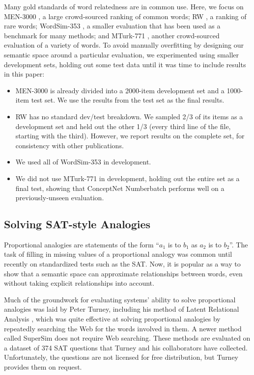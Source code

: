 \documentclass[letterpaper]{article}
\begin{document}
Many gold standards of word relatedness are in common use. Here, we focus on
MEN-3000 \cite{bruni2014men}, a large crowd-sourced ranking of common words; RW
\cite{luong2013rw}, a ranking of rare words; WordSim-353 \cite{finkelstein2001ws},
a smaller evaluation that has been used as a benchmark for many methods; and MTurk-771
\cite{halawi2012mturk}, another crowd-sourced evaluation of a variety of words.
To avoid manually overfitting by designing our semantic space around a
particular evaluation, we experimented using smaller development sets, holding
out some test data until it was time to include results in this paper:

\begin{itemize}
\item
    MEN-3000 is already divided into a 2000-item development set and a
    1000-item test set. We use the results from the test set as the final results.
\item
    RW has no standard dev/test breakdown. We sampled 2/3 of its items as
    a development set and held out the other 1/3 (every third line of the file,
    starting with the third). However, we report results on the complete set,
    for consistency with other publications.
\item
    We used all of WordSim-353 in development.
\item
    We did not use MTurk-771 in development, holding out the entire set
    as a final test, showing that ConceptNet Numberbatch performs well on a
    previously-unseen evaluation.
\end{itemize}

\subsection{Solving SAT-style Analogies}

Proportional analogies are statements of the form ``$a_1$ is to $b_1$ as $a_2$
is to $b_2$''. The task of filling in missing values of a proportional analogy
was common until recently on standardized tests such as the SAT. Now, it is
popular as a way to show that a semantic space can approximate relationships
between words, even without taking explicit relationships into account.

Much of the groundwork for evaluating systems' ability to solve proportional
analogies was laid by Peter Turney, including his method of Latent Relational
Analysis \cite{turney2005lra}, which was quite effective at solving
proportional analogies by repeatedly searching the Web for the words involved
in them. A newer method called SuperSim \cite{turney2013distributional} does
not require Web searching. These methods are evaluated on a dataset of 374 SAT
questions that Turney and his collaborators have collected. Unfortunately, the
questions are not licensed for free distribution, but Turney provides them on
request.
\end{document}
